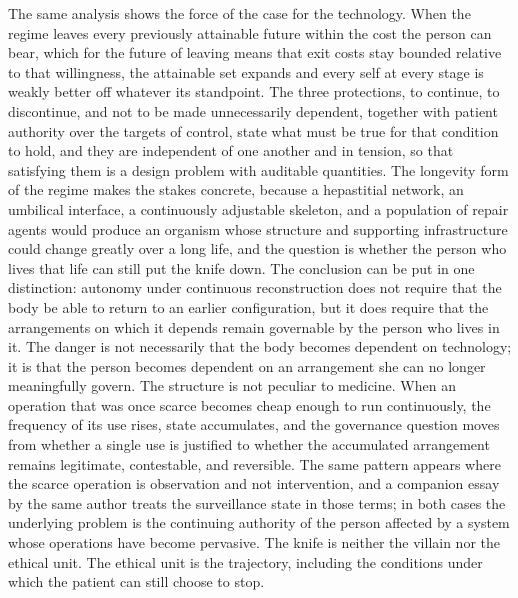 \documentclass[11pt]{article}
\theoremstyle{plain}
\theoremstyle{definition}
\theoremstyle{remark}
\begin{document}
The same analysis shows the force of the case for the technology. When the regime leaves every previously attainable future within the cost the person can bear, which for the future of leaving means that exit costs stay bounded relative to that willingness, the attainable set expands and every self at every stage is weakly better off whatever its standpoint. The three protections, to continue, to discontinue, and not to be made unnecessarily dependent, together with patient authority over the targets of control, state what must be true for that condition to hold, and they are independent of one another and in tension, so that satisfying them is a design problem with auditable quantities. The longevity form of the regime makes the stakes concrete, because a hepastitial network, an umbilical interface, a continuously adjustable skeleton, and a population of repair agents would produce an organism whose structure and supporting infrastructure could change greatly over a long life, and the question is whether the person who lives that life can still put the knife down. The conclusion can be put in one distinction: autonomy under continuous reconstruction does not require that the body be able to return to an earlier configuration, but it does require that the arrangements on which it depends remain governable by the person who lives in it. The danger is not necessarily that the body becomes dependent on technology; it is that the person becomes dependent on an arrangement she can no longer meaningfully govern. The structure is not peculiar to medicine. When an operation that was once scarce becomes cheap enough to run continuously, the frequency of its use rises, state accumulates, and the governance question moves from whether a single use is justified to whether the accumulated arrangement remains legitimate, contestable, and reversible. The same pattern appears where the scarce operation is observation and not intervention, and a companion essay by the same author treats the surveillance state in those terms; in both cases the underlying problem is the continuing authority of the person affected by a system whose operations have become pervasive. The knife is neither the villain nor the ethical unit. The ethical unit is the trajectory, including the conditions under which the patient can still choose to stop.
\end{document}
